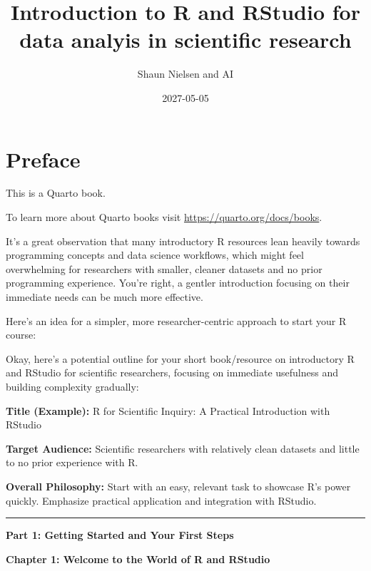 \documentclass[
  letterpaper,
  DIV=11,
  numbers=noendperiod]{scrreprt}
\title{Introduction to R and RStudio for data analyis in scientific
research}
\author{Shaun Nielsen and AI}
\date{2027-05-05}
\renewcommand*\contentsname{Table of contents}
\newcommand\contentsname{Table of contents}
\begin{document}
\maketitle

\renewcommand*\contentsname{Table of contents}
{
\hypersetup{linkcolor=}
\setcounter{tocdepth}{2}
\tableofcontents
}


\chapter*{Preface}\label{preface}


This is a Quarto book.

To learn more about Quarto books visit
\url{https://quarto.org/docs/books}.

It's a great observation that many introductory R resources lean heavily
towards programming concepts and data science workflows, which might
feel overwhelming for researchers with smaller, cleaner datasets and no
prior programming experience. You're right, a gentler introduction
focusing on their immediate needs can be much more effective.

Here's an idea for a simpler, more researcher-centric approach to start
your R course:

Okay, here's a potential outline for your short book/resource on
introductory R and RStudio for scientific researchers, focusing on
immediate usefulness and building complexity gradually:

\textbf{Title (Example):} R for Scientific Inquiry: A Practical
Introduction with RStudio

\textbf{Target Audience:} Scientific researchers with relatively clean
datasets and little to no prior experience with R.

\textbf{Overall Philosophy:} Start with an easy, relevant task to
showcase R's power quickly. Emphasize practical application and
integration with RStudio.

\begin{center}\rule{0.5\linewidth}{0.5pt}\end{center}

\textbf{Part 1: Getting Started and Your First Steps}

\textbf{Chapter 1: Welcome to the World of R and RStudio}
\end{document}
